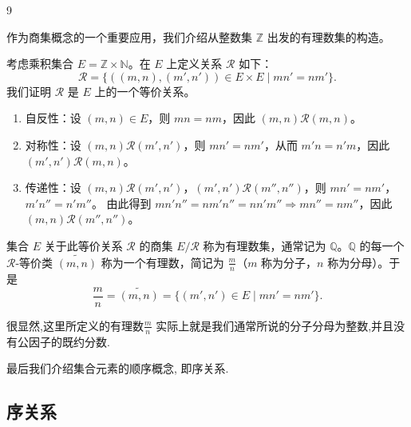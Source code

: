 \begin{sourceexample}{9}

作为商集概念的一个重要应用，我们介绍从整数集 \(\mathbb{Z}\) 出发的有理数集的构造。

考虑乘积集合 \(E = \mathbb{Z} \times \mathbb{N}\)。在 \(E\) 上定义关系 \(\mathscr{R}\) 如下：
\[
\mathscr{R} = \{((m, n), (m', n')) \in E \times E \mid mn' = nm'\}.
\]
我们证明 \(\mathscr{R}\) 是 \(E\) 上的一个等价关系。
\begin{enumerate}[label=\arabic*), noitemsep]
	\item 自反性：设 \((m, n) \in E\)，则 \(mn = nm\)，因此 \((m, n)\mathscr{R}(m, n)\)。
	\item 对称性：设 \((m, n)\mathscr{R}(m', n')\)，则 \(mn' = nm'\)，从而 \(m'n = n'm\)，因此 \((m', n')\mathscr{R}(m, n)\)。
	\item 传递性：设 \((m, n)\mathscr{R}(m', n')\)，\((m', n')\mathscr{R}(m'', n'')\)，则 \(mn' = nm'\)，\(m'n'' = n'm''\)。
	由此得到 \(mn'n'' = nm'n'' = nn'm'' \Longrightarrow mn'' = nm''\)，因此 \((m, n)\mathscr{R}(m'', n'')\)。
\end{enumerate}

集合 \(E\) 关于此等价关系 \(\mathscr{R}\) 的商集 \(E/\mathscr{R}\) 称为有理数集，通常记为 \(\mathbb{Q}\)。\(\mathbb{Q}\) 的每一个 \(\mathscr{R}\)-等价类 \(\widetilde{(m, n)}\) 称为一个有理数，简记为 \(\frac{m}{n}\)（\(m\) 称为分子，\(n\) 称为分母）。于是
\[
\frac{m}{n} = \widetilde{(m,n)} = \{(m', n') \in E \mid mn' = nm'\}.
\]

很显然,这里所定义的有理数\(\frac{m}{n}\) 实际上就是我们通常所说的分子分母为整数,并且没有公因子的既约分数.

\end{sourceexample}

最后我们介绍集合元素的顺序概念, 即序关系.

\subsection{序关系}
	\label{sec:1-2-3}

